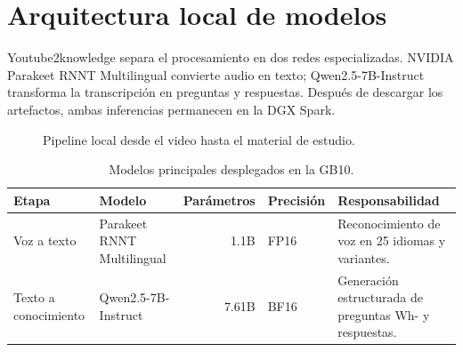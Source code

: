 \appendix
\section{Arquitectura local de modelos}
\label{app:model-architecture}

Youtube2knowledge separa el procesamiento en dos redes especializadas. NVIDIA
Parakeet RNNT Multilingual convierte audio en texto; Qwen2.5-7B-Instruct
transforma la transcripción en preguntas y respuestas. Después de descargar los
artefactos, ambas inferencias permanecen en la DGX Spark.

\begin{figure}[htbp]
  \centering
  \caption{Pipeline local desde el video hasta el material de estudio.}
  \label{fig:local-pipeline}
\end{figure}

\begin{table}[htbp]
  \centering
  \caption{Modelos principales desplegados en la GB10.}
  \label{tab:deployed-models}
  \begin{tabularx}{\textwidth}{@{}l l r l X@{}}
    \toprule
    Etapa & Modelo & Parámetros & Precisión & Responsabilidad \\
    \midrule
    Voz a texto & Parakeet RNNT Multilingual & 1.1B & FP16 &
      Reconocimiento de voz en 25 idiomas y variantes. \\
    Texto a conocimiento & Qwen2.5-7B-Instruct & 7.61B & BF16 &
      Generación estructurada de preguntas Wh- y respuestas. \\
    \bottomrule
  \end{tabularx}
\end{table}

